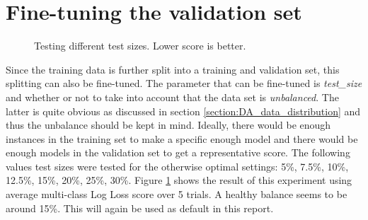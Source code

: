 
\section{Fine-tuning the validation set}
\label{section:LBM_finetuning_validation_set}

\begin{figure}
    \centering
    \vspace*{-0.5cm}
    \captionsetup{width=0.85\linewidth}
    \captionsetup{justification=centering}
    \caption{Testing different test sizes. Lower score is better.}
    \label{fig:2-LBM-test_size_sift}
\end{figure}

Since the training data is further split into a training and validation set, this splitting can also be fine-tuned.
The parameter that can be fine-tuned is \textit{test\_size} and whether or not to take into account that the data set is \textit{unbalanced}.
The latter is quite obvious as discussed in section \ref{section:DA_data_distribution} and thus the unbalance should be kept in mind.
Ideally, there would be enough instances in the training set to make a specific enough model and there would be enough models in the validation set to get a representative score. 
The following values test sizes were tested for the otherwise optimal settings: 5\%, 7.5\%, 10\%, 12.5\%, 15\%, 20\%, 25\%, 30\%.
Figure \ref{fig:2-LBM-test_size_sift} shows the result of this experiment using average multi-class Log Loss score over 5 trials.
A healthy balance seems to be around 15\%.
This will again be used as default in this report.



